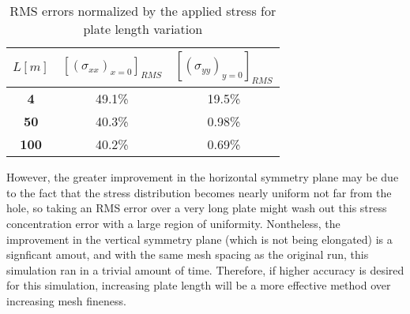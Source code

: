 \documentclass[twocolumn,10pt]{asme2ej}
\begin{document}
\begin{table}[htb]
\begin{center}
\label{table_ASME}
\begin{tabular}{|c | c c |}
\hline
$L [m]$  & \textbf{$[(\sigma_{xx})_{x=0}]_{RMS}$} & \textbf{$[(\sigma_{yy})_{y=0}]_{RMS}$}\\
\hline
\textbf{4}         	  & 49.1\% & 19.5\%\\
\textbf{50} 		  & 40.3\% & 0.98\%\\
\textbf{100}		  & 40.2\% & 0.69\%\\
\hline
\end{tabular}
\caption{RMS errors normalized by the applied stress for plate length variation}
\end{center}
\end{table}

However, the greater improvement in the horizontal symmetry plane may be due to the fact that the stress distribution becomes nearly uniform not far from the hole, so taking an RMS error over a very long plate might wash out this stress concentration error with a large region of uniformity.  Nontheless, the improvement in the vertical symmetry plane (which is not being elongated) is a signficant amout, and with the same mesh spacing as the original run, this simulation ran in a trivial amount of time.  Therefore, if higher accuracy is desired for this simulation, increasing plate length will be a more effective method over increasing mesh fineness.
\end{document}
